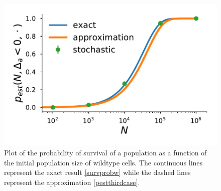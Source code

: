 \documentclass[12pt]{extarticle}
\begin{document}
\begin{figure}[!t]
 \vspace*{1\baselineskip}
\includegraphics[width=1\textwidth]{Figures/DeleteriousTauLeapPlot.pdf}
\caption{Plot of the probability of survival of a population as a function of the initial population size of wildtype cells. The continuous lines represent the exact result \eqref{survprobw} while the dashed lines represent the approximation \eqref{pestthirdcase}.}
\label{DeleteriousPlot}
\end{figure}

\end{document}
